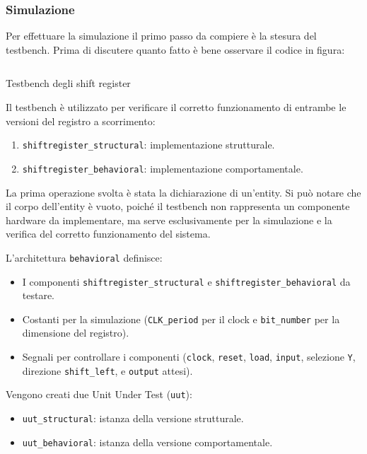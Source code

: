 \subsubsection{Simulazione}

Per effettuare la simulazione il primo passo da compiere è la stesura del testbench. Prima di discutere quanto fatto è bene osservare il codice in figura:

\begin{code}
    \inputminted{vhdl}{vhdl/shiftregister_tb.vhd}
    \caption{Testbench degli shift register}
    \label{cod:shiftregister_tb}
\end{code}

Il testbench è utilizzato per verificare il corretto funzionamento di entrambe le versioni del registro a scorrimento:

\begin{enumerate}
    \item \texttt{shiftregister\_structural}: implementazione strutturale.
    \item \texttt{shiftregister\_behavioral}: implementazione comportamentale.
\end{enumerate}

La prima operazione svolta è stata la dichiarazione di un’entity. Si può notare che il corpo dell’entity è vuoto, poiché il testbench non rappresenta un componente hardware da implementare, ma serve esclusivamente per la simulazione e la verifica del corretto funzionamento del sistema.

L'architettura \texttt{behavioral} definisce:

\begin{itemize}
    \item I componenti \texttt{shiftregister\_structural} e \texttt{shiftregister\_behavioral} da testare.
    \item Costanti per la simulazione (\texttt{CLK\_period} per il clock e \texttt{bit\_number} per la dimensione del registro).
    \item Segnali per controllare i componenti (\texttt{clock}, \texttt{reset}, \texttt{load}, \texttt{input}, selezione \texttt{Y}, direzione \texttt{shift\_left}, e \texttt{output} attesi).
\end{itemize}

Vengono creati due Unit Under Test (\texttt{uut}):

\begin{itemize}
    \item \texttt{uut\_structural}: istanza della versione strutturale.
    \item \texttt{uut\_behavioral}: istanza della versione comportamentale.
\end{itemize}

